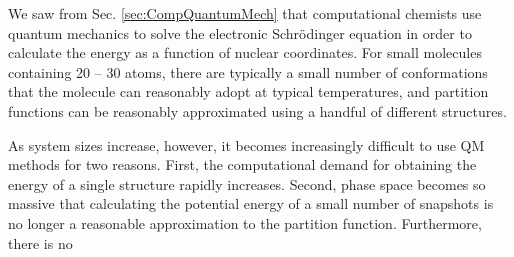 We saw from Sec. \ref{sec:CompQuantumMech} that computational chemists use
quantum mechanics to solve the electronic Schr\"odinger equation in order to
calculate the energy as a function of nuclear coordinates. For small molecules
containing 20 -- 30 atoms, there are typically a small number of conformations
that the molecule can reasonably adopt at typical temperatures, and partition
functions can be reasonably approximated using a handful of different
structures.

As system sizes increase, however, it becomes increasingly difficult to use QM
methods for two reasons. First, the computational demand for obtaining the
energy of a single structure rapidly increases. Second, phase space becomes so
massive that calculating the potential energy of a small number of snapshots is
no longer a reasonable approximation to the partition function. Furthermore,
there is no 
